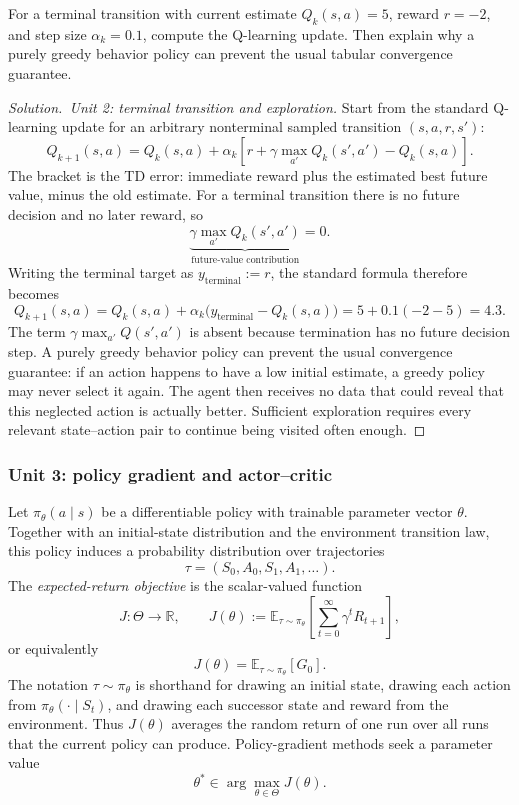 \documentclass[11pt,a4paper]{article}
\theoremstyle{definition}
\newenvironment{solution}[1][]{\begin{proof}[Solution.\ #1]}{\end{proof}}
\begin{document}
\begin{exercise}
For a terminal transition with current estimate $Q_k(s,a)=5$, reward $r=-2$, and
step size $\alpha_k=0.1$, compute the Q-learning update. Then explain why a purely greedy
behavior policy can prevent the usual tabular convergence guarantee.
\end{exercise}

\begin{solution}[Unit 2: terminal transition and exploration]
Start from the standard Q-learning update for an arbitrary nonterminal sampled transition
$(s,a,r,s')$:
\[
Q_{k+1}(s,a)=Q_k(s,a)+\alpha_k
\left[r+\gamma\max_{a'}Q_k(s',a')-Q_k(s,a)\right].
\]
The bracket is the TD error: immediate reward plus the estimated best future value, minus the
old estimate. For a terminal transition there is no future decision and no later reward, so
\[
\underbrace{\gamma\max_{a'}Q_k(s',a')}_{\text{future-value contribution}}=0.
\]
Writing the terminal target as $y_{\mathrm{terminal}}:=r$, the standard formula therefore
becomes
\[
Q_{k+1}(s,a)
=Q_k(s,a)+\alpha_k\bigl(y_{\mathrm{terminal}}-Q_k(s,a)\bigr)
=5+0.1(-2-5)=4.3.
\]
The term $\gamma\max_{a'}Q(s',a')$ is absent because termination has no future decision
step. A purely greedy behavior policy can prevent the usual convergence guarantee: if an
action happens to have a low initial estimate, a greedy policy may never select it again.
The agent then receives no data that could reveal that this neglected action is actually
better. Sufficient exploration requires every relevant state--action pair to continue being
visited often enough.
\end{solution}

\subsubsection{Unit 3: policy gradient and actor--critic}
\label{unit:3}

\begin{definition}\label{def:j-theta}
Let $\pi_\theta(a\mid s)$ be a differentiable policy with trainable parameter vector $\theta$.
Together with an initial-state distribution and the environment transition law, this policy
induces a probability distribution over trajectories
\[
\tau=(S_0,A_0,S_1,A_1,\ldots).
\]
The \emph{expected-return objective} is the scalar-valued function
\[
J:\Theta\longrightarrow\mathbb{R},
\qquad
J(\theta):=\mathbb{E}_{\tau\sim\pi_\theta}
\left[\sum_{t=0}^{\infty}\gamma^tR_{t+1}\right],
\]
or equivalently
\[
J(\theta)=\mathbb{E}_{\tau\sim\pi_\theta}[G_0].
\]
The notation $\tau\sim\pi_\theta$ is shorthand for drawing an initial state, drawing each
action from $\pi_\theta(\cdot\mid S_t)$, and drawing each successor state and reward from the
environment. Thus $J(\theta)$ averages the random return of one run over all runs that the
current policy can produce. Policy-gradient methods seek a parameter value
\[
\theta^*\in\arg\max_{\theta\in\Theta}J(\theta).
\]
\end{definition}
\end{document}
